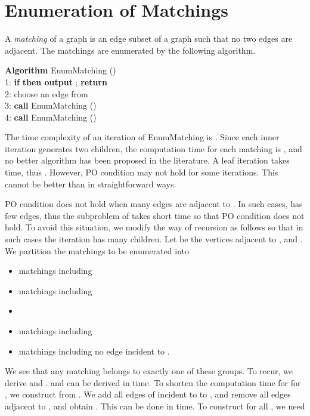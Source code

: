 \documentclass{llncs}
\begin{document}
\vspace{-4mm}
\section{Enumeration of Matchings}\label{sec:match}
\vspace{-2mm}

A {\it matching} of a graph is an edge subset of a graph 
 such that no two edges are adjacent.
The matchings are enumerated by the following algorithm.

\begin{tabbing}
{\bf Algorithm} EnumMatching ()\\
1: {\bf if}  {\bf then output} ; {\bf return}\\
2: choose an edge  from \\
3: {\bf call} EnumMatching ()\\
4: {\bf call} EnumMatching ()
\end{tabbing}

\noindent
The time complexity of an iteration of EnumMatching is .
Since each inner iteration generates two children, the computation
 time for each matching is , and no better algorithm
 has been proposed in the literature.
A leaf iteration takes  time, thus .
However, PO condition may not hold for some iterations.
This cannot be better than  in straightforward ways.

PO condition does not hold when many edges are adjacent to .
In such cases,  has few edges, thus the subproblem of
  takes short time so that PO condition does not hold.
To avoid this situation, we modify the way of recursion as follows
 so that in such cases the iteration has many children.
Let  be the vertices adjacent to , and .
We partition the matchings to be enumerated into 

\vspace{-1mm}
\begin{itemize}
\item matchings including 
\item matchings including 
\item 
\item matchings including 
\item matchings including no edge incident to .
\end{itemize}
\vspace{-1mm}

We see that any matching belongs to exactly one of these groups.
To recur, we derive  and .
 and  can be derived in  time.
To shorten the computation time for  for , 
 we construct  from .
We add all edges of  incident to  to ,
 and remove all edges adjacent to , and obtain .
This can be done in  time.
To construct  for all , we need 
\end{document}
